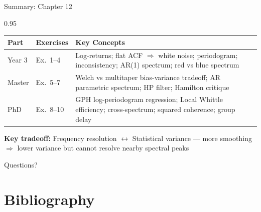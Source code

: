 \documentclass[9pt, aspectratio=169, t]{beamer}
\begin{document}
\begin{frame}{Summary: Chapter 12}
    \begin{cminipage}{0.95\textwidth}
    {\footnotesize
    \begin{center}
    \begin{tabular}{p{2.2cm}p{2.5cm}p{7.5cm}}
        \toprule
        \textbf{Part} & \textbf{Exercises} & \textbf{Key Concepts} \\
        \midrule
        Year 3 & Ex.\ 1--4 & Log-returns; flat ACF $\Rightarrow$ white noise; periodogram; inconsistency; AR(1) spectrum; red vs blue spectrum \\[4pt]
        Master & Ex.\ 5--7 & Welch vs multitaper bias-variance tradeoff; AR parametric spectrum; HP filter; Hamilton critique \\[4pt]
        PhD & Ex.\ 8--10 & GPH log-periodogram regression; Local Whittle efficiency; cross-spectrum; squared coherence; group delay \\
        \bottomrule
    \end{tabular}
    \end{center}

    {\scriptsize \textbf{Key tradeoff:} Frequency resolution $\longleftrightarrow$ Statistical variance --- more smoothing $\Rightarrow$ lower variance but cannot resolve nearby spectral peaks}
    }

    \vspace{0.2cm}
    \begin{center}
        \Large\textcolor{MainBlue}{Questions?}
    \end{center}
    \end{cminipage}
\end{frame}

\section{Bibliography}
\end{document}
